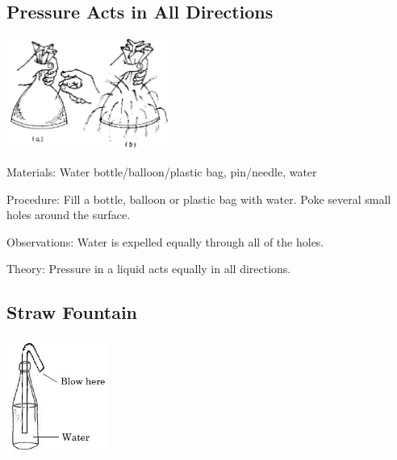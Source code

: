 \begin{multicols}{2}
\subsection{Pressure Acts in All Directions}

\begin{center}
\includegraphics[width=0.4\textwidth]{./img/source/pressure-direction.png}
\end{center}

\begin{description*}
\item[Materials:]{Water bottle/balloon/plastic bag, pin/needle, water}
\item[Procedure:]{Fill a bottle, balloon or plastic bag with water. Poke several small holes around the surface.}
\item[Observations:]{Water is expelled equally through all of the holes.}
\item[Theory:]{Pressure in a liquid acts equally in all directions.}
\end{description*}

\subsection{Straw Fountain}

\begin{center}
\includegraphics[width=0.25\textwidth]{./img/vso/straw-fountain.jpg}
\end{center}


\end{multicols}
